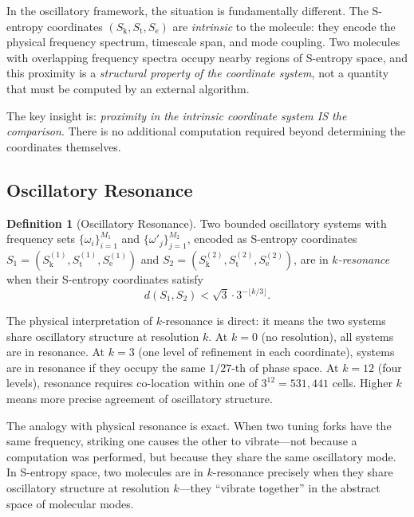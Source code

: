 \documentclass[11pt,twocolumn,a4paper]{article}
\theoremstyle{definition}
\newtheorem{definition}[theorem]{Definition}
\theoremstyle{remark}
\newcommand{\Sk}{S_{\mathrm{k}}}
\newcommand{\St}{S_{\mathrm{t}}}
\newcommand{\Se}{S_{\mathrm{e}}}
\begin{document}
In the oscillatory framework, the situation is fundamentally different. The S-entropy coordinates $(\Sk, \St, \Se)$ are \emph{intrinsic} to the molecule: they encode the physical frequency spectrum, timescale span, and mode coupling. Two molecules with overlapping frequency spectra occupy nearby regions of S-entropy space, and this proximity is a \emph{structural property of the coordinate system}, not a quantity that must be computed by an external algorithm.

The key insight is: \emph{proximity in the intrinsic coordinate system IS the comparison}. There is no additional computation required beyond determining the coordinates themselves.

\subsection{Oscillatory Resonance}\label{sec:oscillatory-resonance}

\begin{definition}[Oscillatory Resonance]\label{def:resonance}
Two bounded oscillatory systems with frequency sets $\{\omega_i\}_{i=1}^{M_1}$ and $\{\omega'_j\}_{j=1}^{M_2}$, encoded as S-entropy coordinates $S_1 = (\Sk^{(1)}, \St^{(1)}, \Se^{(1)})$ and $S_2 = (\Sk^{(2)}, \St^{(2)}, \Se^{(2)})$, are in \emph{$k$-resonance} when their S-entropy coordinates satisfy
\begin{equation}\label{eq:k-resonance}
  d(S_1, S_2) < \sqrt{3} \cdot 3^{-\lfloor k/3 \rfloor}.
\end{equation}
\end{definition}

The physical interpretation of $k$-resonance is direct: it means the two systems share oscillatory structure at resolution $k$. At $k = 0$ (no resolution), all systems are in resonance. At $k = 3$ (one level of refinement in each coordinate), systems are in resonance if they occupy the same $1/27$-th of phase space. At $k = 12$ (four levels), resonance requires co-location within one of $3^{12} = 531{,}441$ cells. Higher $k$ means more precise agreement of oscillatory structure.

The analogy with physical resonance is exact. When two tuning forks have the same frequency, striking one causes the other to vibrate---not because a computation was performed, but because they share the same oscillatory mode. In S-entropy space, two molecules are in $k$-resonance precisely when they share oscillatory structure at resolution $k$---they ``vibrate together'' in the abstract space of molecular modes.
\end{document}
